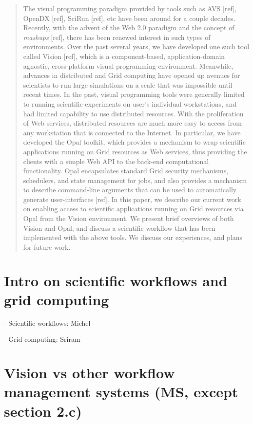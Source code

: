 \documentclass[conference]{IEEEtran}
\begin{document}
\begin{abstract}

  The visual programming paradigm provided by tools such as AVS [ref],
  OpenDX [ref], SciRun [ref], etc have been around for a couple decades.
  Recently, with the advent of the Web 2.0 paradigm and the concept of {\em
    mashups} [ref], there has been renewed interest in such types of
  environments. Over the past several years, we have developed one such
  tool called Vision [ref], which is a component-based, application-domain
  agnostic, cross-platform visual programming environment. Meanwhile,
  advances in distributed and Grid computing have opened up avenues for
  scientists to run large simulations on a scale that was impossible until
  recent times. In the past, visual programming tools were generally
  limited to running scientific experiments on user's individual
  workstations, and had limited capability to use distributed resources.
  With the proliferation of Web services, distributed resources are much
  more easy to access from any workstation that is connected to the
  Internet. In particular, we have developed the Opal toolkit, which
  provides a mechanism to wrap scientific applications running on Grid
  resources as Web services, thus providing the clients with a simple Web
  API to the back-end computational functionality. Opal encapsulates
  standard Grid security mechanisms, schedulers, and state management for
  jobs, and also provides a mechanism to describe command-line arguments
  that can be used to automatically generate user-interfaces [ref]. In this
  paper, we describe our current work on enabling access to scientific
  applications running on Grid resources via Opal from the Vision
  environment. We present brief overviews of both Vision and Opal, and
  discuss a scientific workflow that has been implemented with the above
  tools. We discuss our experiences, and plans for future work.

\end{abstract}

\section{Intro on scientific workflows and grid computing}

- Scientific workflows: Michel

- Grid computing: Sriram

\section {Vision vs other workflow management systems (MS, except section
  2.c)}
\end{document}
